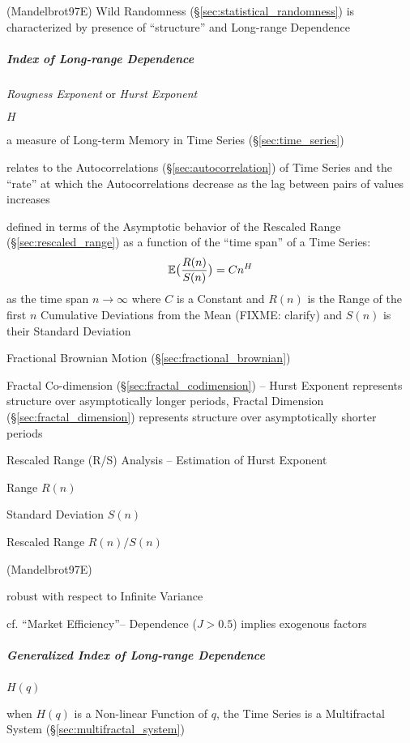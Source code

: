 (Mandelbrot97E) Wild Randomness (\S\ref{sec:statistical_randomness}) is
characterized by presence of ``structure'' and Long-range Dependence



\subparagraph{Index of Long-range Dependence}\label{sec:hurst_exponent}\hfill

\emph{Rougness Exponent} or \emph{Hurst Exponent}

$H$

a measure of Long-term Memory in Time Series (\S\ref{sec:time_series})

relates to the Autocorrelations (\S\ref{sec:autocorrelation}) of Time Series and
the ``rate'' at which the Autocorrelations decrease as the lag between pairs of
values increases

defined in terms of the Asymptotic behavior of the Rescaled Range
(\S\ref{sec:rescaled_range}) as a function of the ``time span'' of a Time
Series:
\[
  \mathbb{E}\big(\frac{R(n)}{S(n)}\big) = Cn^H
\]
as the time span $n \to \infty$ where $C$ is a Constant and $R(n)$ is the Range
of the first $n$ Cumulative Deviations from the Mean (FIXME: clarify) and $S(n)$
is their Standard Deviation

Fractional Brownian Motion (\S\ref{sec:fractional_brownian})

Fractal Co-dimension (\S\ref{sec:fractal_codimension}) -- Hurst Exponent
represents structure over asymptotically longer periods, Fractal Dimension
(\S\ref{sec:fractal_dimension}) represents structure over asymptotically shorter
periods

Rescaled Range (R/S) Analysis -- Estimation of Hurst Exponent

Range $R(n)$

Standard Deviation $S(n)$

Rescaled Range $R(n) / S(n)$

(Mandelbrot97E)

robust with respect to Infinite Variance

cf. ``Market Efficiency''-- Dependence ($J > 0.5$) implies exogenous factors



\subparagraph{Generalized Index of Long-range Dependence}
\label{sec:generalized_hurst}\hfill

$H(q)$

when $H(q)$ is a Non-linear Function of $q$, the Time Series is a Multifractal
System (\S\ref{sec:multifractal_system})



